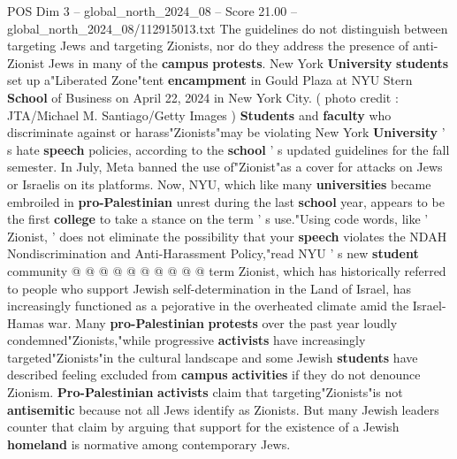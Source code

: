 \begin{textsample}{POS Dim 3 – global\_north\_2024\_08 – Score 21.00 – global\_north\_2024\_08/112915013.txt}  \label{ex:f3_pos_138}
The guidelines do not distinguish between targeting Jews and targeting Zionists, nor do they address the presence of anti-Zionist Jews in many of the \textbf{campus} \textbf{protests}.
New York \textbf{University} \textbf{students} set up a"Liberated Zone"tent \textbf{encampment} in Gould Plaza at NYU Stern \textbf{School} of Business on April 22, 2024 in New York City. ( photo credit : JTA/Michael M.
Santiago/Getty Images ) \textbf{Students} and \textbf{faculty} who discriminate against or harass"Zionists"may be violating New York \textbf{University} ' s hate \textbf{speech} policies, according to the \textbf{school} ' s updated guidelines for the fall semester.
In July, Meta banned the use of"Zionist"as a cover for attacks on Jews or Israelis on its platforms.
Now, NYU, which like many \textbf{universities} became embroiled in \textbf{pro-Palestinian} unrest during the last \textbf{school} year, appears to be the first \textbf{college} to take a stance on the term ' s use."Using code words, like ' Zionist, ' does not eliminate the possibility that your \textbf{speech} violates the NDAH Nondiscrimination and Anti-Harassment Policy,"read NYU ' s new \textbf{student} community @ @ @ @ @ @ @ @ @ @ term Zionist, which has historically referred to people who support Jewish self-determination in the Land of Israel, has increasingly functioned as a pejorative in the overheated climate amid the Israel-Hamas war.
Many \textbf{pro-Palestinian} \textbf{protests} over the past year loudly condemned"Zionists,"while progressive \textbf{activists} have increasingly targeted"Zionists"in the cultural landscape and some Jewish \textbf{students} have described feeling excluded from \textbf{campus} \textbf{activities} if they do not denounce Zionism. \textbf{Pro-Palestinian} \textbf{activists} claim that targeting"Zionists"is not \textbf{antisemitic} because not all Jews identify as Zionists.
But many Jewish leaders counter that claim by arguing that support for the existence of a Jewish \textbf{homeland} is normative among contemporary Jews.

\end{textsample}
